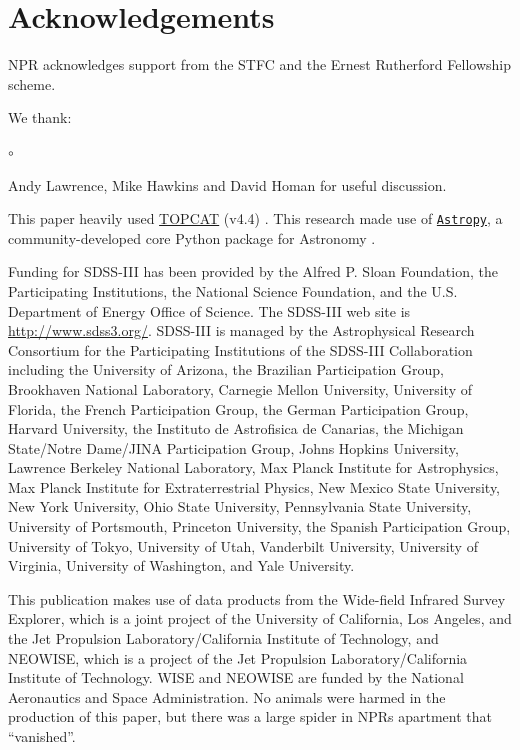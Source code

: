 \documentclass[a4paper,fleqn,usenatbib]{mnras}
\begin{document}
\section*{Acknowledgements}
NPR acknowledges support from the STFC and the Ernest Rutherford Fellowship scheme. 

\noindent
We thank:
\begin{list}{$\circ$}{}  
  \item Andy Lawrence, Mike Hawkins and David Homan for useful discussion. 
\end{list}

This paper heavily used \href{http://www.star.bris.ac.uk/~mbt/topcat/}{TOPCAT} (v4.4)
\citep[][]{Taylor2005, Taylor2011}.
This research made use of \href{http://www.astropy.org}{\tt Astropy}, 
a community-developed core Python package for Astronomy 
\citep{AstropyCollaboration2013, AstropyCollaboration2018}.

Funding for SDSS-III has been provided by the Alfred P. Sloan
Foundation, the Participating Institutions, the National Science
Foundation, and the U.S. Department of Energy Office of Science. The
SDSS-III web site is
\href{http://www.sdss3.org/}{http://www.sdss3.org/}.
SDSS-III is managed by the Astrophysical Research Consortium for the
Participating Institutions of the SDSS-III Collaboration including the
University of Arizona, the Brazilian Participation Group, Brookhaven
National Laboratory, Carnegie Mellon University, University of
Florida, the French Participation Group, the German Participation
Group, Harvard University, the Instituto de Astrofisica de Canarias,
the Michigan State/Notre Dame/JINA Participation Group, Johns Hopkins
University, Lawrence Berkeley National Laboratory, Max Planck
Institute for Astrophysics, Max Planck Institute for Extraterrestrial
Physics, New Mexico State University, New York University, Ohio State
University, Pennsylvania State University, University of Portsmouth,
Princeton University, the Spanish Participation Group, University of
Tokyo, University of Utah, Vanderbilt University, University of
Virginia, University of Washington, and Yale University.

This publication makes use of data products from the Wide-field
Infrared Survey Explorer, which is a joint project of the University
of California, Los Angeles, and the Jet Propulsion
Laboratory/California Institute of Technology, and NEOWISE, which is a
project of the Jet Propulsion Laboratory/California Institute of
Technology. WISE and NEOWISE are funded by the National Aeronautics
and Space Administration. No animals were harmed in the production of
this paper, but there was a large spider in NPRs apartment that
``vanished''.





\bsp	%
\label{lastpage}
\end{document}
